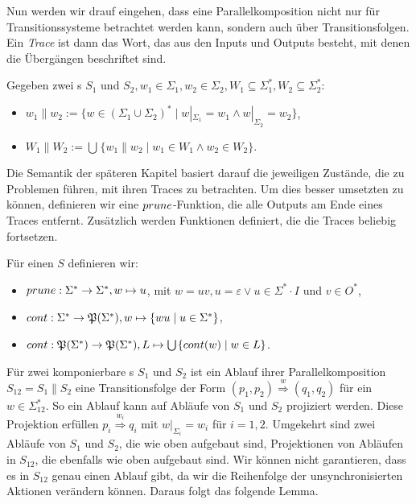 Nun werden wir drauf eingehen, dass eine Parallelkomposition nicht nur für
Transitionssysteme betrachtet werden kann, sondern auch über Transitionsfolgen. Ein
\emph{Trace} ist dann das Wort, das aus den Inputs und Outputs besteht, mit denen die
Übergängen beschriftet sind.

\begin{Def}
  Gegeben zwei \EIO{}s $S_1$ und $S_2,
  w_1\in\Sigma _1, w_2\in\Sigma _2, W_1\subseteq\Sigma _1^*, W_2\subseteq\Sigma
  _2^*$:
  \begin{itemize}
    \item $w_1\| w_2:=\{w\in (\Sigma _1\cup\Sigma _2)^*\mid w|_{\Sigma _1}=w_1\wedge
      w|_{\Sigma _2}=w_2\}$,
    \item $W_1\| W_2:=\bigcup\hspace{1pt}\{w_1\| w_2\mid w_1\in W_1\wedge w_2\in W_2\}$.
  \end{itemize}
\end{Def}

Die Semantik der späteren Kapitel basiert darauf die jeweiligen Zustände, die
zu Problemen führen, mit ihren Traces zu betrachten. Um dies besser umsetzten zu
können, definieren wir eine $prune{}$-Funktion, die alle Outputs am Ende
eines Traces entfernt. Zusätzlich werden Funktionen definiert, die
die Traces beliebig fortsetzen.

\begin{Def}
  Für einen \EIO{} $S$ definieren wir:
  \begin{itemize}
    \item $prune{}:\Sigma ^*\rightarrow\Sigma ^*, w\mapsto u$, mit $w=uv,
      u=\varepsilon\vee u\in\Sigma ^*\cdot I$ und $v\in O^*$,
    \item $cont{}:\Sigma ^*\rightarrow\mathfrak{P}(\Sigma ^*),
      w\mapsto\{wu\mid u\in\Sigma ^*\}$,
    \item $cont{}:\mathfrak{P}(\Sigma ^*)\rightarrow\mathfrak{P}(\Sigma ^*),
      L\mapsto\bigcup\hspace{1pt}\{cont{}(w)\mid w\in L\}$.
  \end{itemize}
\end{Def}

Für zwei komponierbare \EIO{}s $S_1$ und $S_2$ ist ein Ablauf ihrer
Parallelkomposition $S_{12}=S_1\| S_2$ eine Transitionsfolge der Form $(p_1,p_2)
\overset{w}{\Rightarrow} (q_1,q_2)$ für ein $w\in\Sigma_{12}^*$. So ein Ablauf
kann auf Abläufe von $S_1$ und $S_2$ projiziert werden. Diese Projektion
erfüllen $p_i \overset{w_i}{\Rightarrow} q_i$ mit $w|_{\Sigma
_i}=w_i$ für $i=1,2$. Umgekehrt sind zwei Abläufe von $S_1$ und $S_2$,
die wie oben aufgebaut sind, Projektionen von Abläufen in
$S_{12}$, die ebenfalls wie oben aufgebaut sind. Wir können nicht garantieren,
dass es in $S_{12}$ genau einen Ablauf gibt, da wir die Reihenfolge der
unsynchronisierten Aktionen verändern können. Daraus folgt das folgende Lemma.

